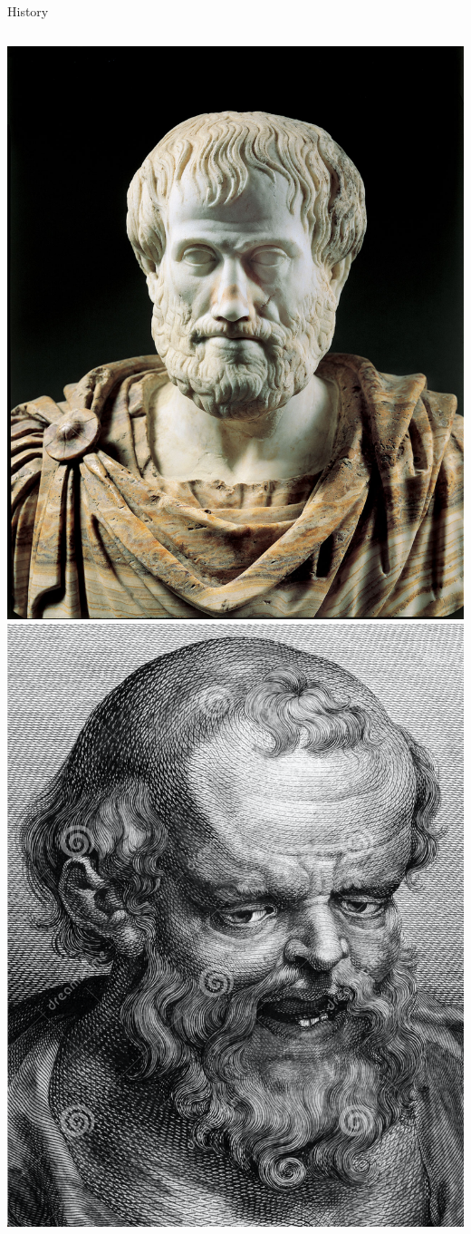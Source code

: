 \documentclass{beamer}
\begin{document}
{\begin{frame}{History}
\begin{columns}
\begin{column}{0.16\textwidth}
            \includegraphics[scale=0.05]{figures/Aristotle.jpg}\\
            \includegraphics[scale=0.117]{figures/democritus.png}

\end{column}
\end{columns}
\end{frame}}
\end{document}
